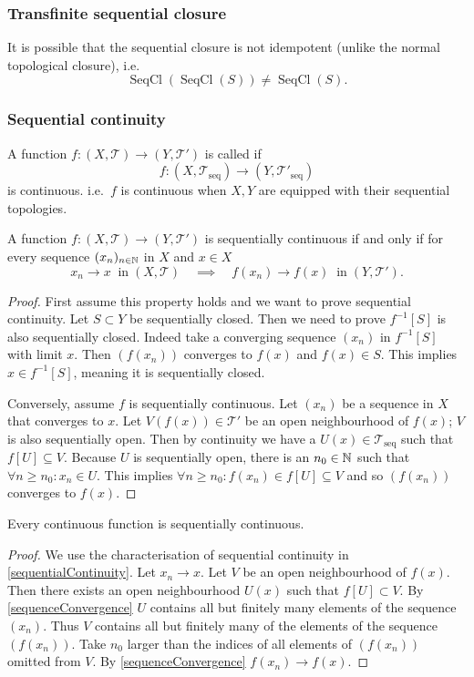 \subsubsection{Transfinite sequential closure}
It is possible that the sequential closure is not idempotent (unlike the normal topological closure), i.e.\
\[ \operatorname{SeqCl}(\operatorname{SeqCl}(S)) \neq \operatorname{SeqCl}(S). \]

\subsubsection{Sequential continuity}
\begin{definition}
A function $f:(X,\mathcal{T})\to(Y,\mathcal{T}')$ is called  if
\[ f:(X,\mathcal{T}_\text{seq})\to(Y,\mathcal{T}'_\text{seq}) \]
is continuous. i.e.\ $f$ is continuous when $X,Y$ are equipped with their sequential topologies.
\end{definition}

\begin{proposition} \label{sequentialContinuity}
A function $f:(X,\mathcal{T})\to(Y,\mathcal{T}')$ is sequentially continuous \textup{if and only if} for every sequence $(x_n)_{n\in\mathbb{N}}$ in $X$ and $x\in X$
\[ x_n \to x \;\;\text{in}\; (X,\mathcal{T}) \quad\implies\quad f(x_n)\to f(x) \;\;\text{in}\; (Y,\mathcal{T}'). \]
\end{proposition}
\begin{proof}
First assume this property holds and we want to prove sequential continuity. Let $S\subset Y$ be sequentially closed. Then we need to prove $f^{-1}[S]$ is also sequentially closed. Indeed take a converging sequence $(x_n)$ in $f^{-1}[S]$ with limit $x$. Then $(f(x_n))$ converges to $f(x)$ and $f(x)\in S$. This implies $x\in f^{-1}[S]$, meaning it is sequentially closed. 

Conversely, assume $f$ is sequentially continuous. Let $(x_n)$ be a sequence in $X$ that converges to $x$. Let $V(f(x))\in \mathcal{T}'$ be an open neighbourhood of $f(x)$; $V$ is also sequentially open. Then by continuity we have a $U(x)\in\mathcal{T}_\text{seq}$ such that $f[U]\subseteq V$. Because $U$ is sequentially open, there is an $n_0\in\mathbb{N}$ such that $\forall n\geq n_0: x_n\in U$.
This implies $\forall n\geq n_0: f(x_n)\in f[U]\subseteq V$ and so $(f(x_n))$ converges to $f(x)$.
\end{proof}
\begin{proposition}
Every continuous function is sequentially continuous.
\end{proposition}
\begin{proof}
We use the characterisation of sequential continuity in \ref{sequentialContinuity}. Let $x_n\to x$. Let $V$ be an open neighbourhood of $f(x)$. Then there exists an open neighbourhood $U(x)$ such that $f[U]\subset V$. By \ref{sequenceConvergence} $U$ contains all but finitely many elements of the sequence $(x_n)$. Thus $V$ contains all but finitely many of the elements of the sequence $(f(x_n))$. Take $n_0$ larger than the indices of all elements of $(f(x_n))$ omitted from $V$. By \ref{sequenceConvergence} $f(x_n)\to f(x)$.
\end{proof}

